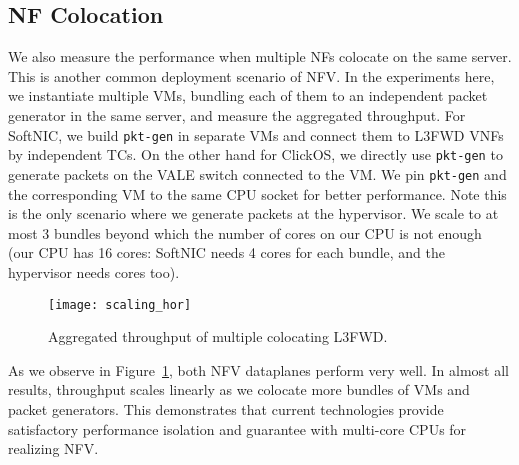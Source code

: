 \subsection{NF Colocation}
\label{sec:colocation}

We also measure the performance when multiple NFs colocate on the same server. This is another common deployment scenario of NFV. In the experiments here, we instantiate multiple VMs, bundling each of them to an independent packet generator in the same server, and measure the aggregated throughput.  
For SoftNIC, we build {\tt pkt-gen} in separate VMs and connect them to L3FWD VNFs by independent TCs. On the other hand for ClickOS, we directly use {\tt pkt-gen} to generate packets on the VALE switch connected to the VM. We pin {\tt pkt-gen} and the corresponding VM to the same CPU socket for better performance. Note this is the only scenario where we generate packets at the hypervisor. We scale to at most 3 bundles beyond which the number of cores on our CPU is not enough (our CPU has 16 cores: SoftNIC needs 4 cores for each bundle, and the hypervisor needs cores too).

\begin{figure}[ht]
\centering
    \vspace{-2mm}
    \texttt{[image: scaling\_hor]}
    \caption{Aggregated throughput of multiple colocating L3FWD. }
    \label{fig:scaling}
    \vspace{-4mm}
\end{figure}

As we observe in Figure~\ref{fig:scaling}, both NFV dataplanes perform very well. In almost all results, throughput scales linearly as we colocate more bundles of VMs and packet generators. 
This demonstrates that current technologies provide satisfactory performance isolation and guarantee with multi-core CPUs for realizing NFV.




